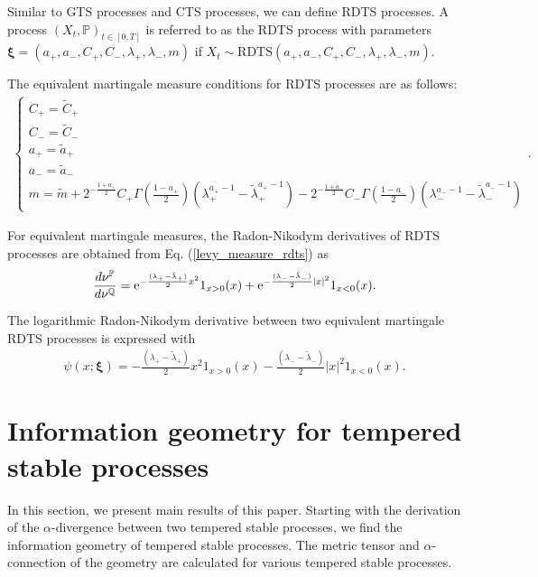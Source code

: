 \documentclass[preprint,11pt]{amsart}
\begin{document}
	Similar to GTS processes and CTS processes, we can define RDTS processes. A process $(X_t, \mathbb{P})_{t\in[0,T]}$ is referred to as the RDTS process with parameters $\boldsymbol{\xi}=(a_+, a_-, C_+, C_-, \lambda_+, \lambda_-, m)$ if $X_t\sim\mathrm{RDTS}(a_+, a_-, C_+, C_-,\lambda_+,\lambda_-,m)$.
	
	The equivalent martingale measure conditions for RDTS processes \cite{rachev2011financial} are as follows:
	\begin{align}
	\label{emm_rdts}
	\left\{ 
		\begin{array}{ll}
			C_+=\tilde{C}_+\\
			C_-=\tilde{C}_-\\
			a_+=\tilde{a}_+\\
			a_-=\tilde{a}_-\\
			m=\tilde{m}+2^{-\frac{1+a_+}{2}}C_+\Gamma(\frac{1-a_+}{2})(\lambda_+^{a_+-1}-\tilde{\lambda}_{+}^{a_+-1})-2^{-\frac{1+a_-}{2}}C_-\Gamma(\frac{1-a_-}{2})(\lambda_-^{a_--1}-\tilde{\lambda}_{-}^{a_--1})
		\end{array}
		\right..
	\end{align}
	
	For equivalent martingale measures, the Radon-Nikodym derivatives of RDTS processes are obtained from Eq. (\ref{levy_measure_rdts}) as
	\begin{align}
	\label{radon_nikodym_rdts}
		\frac{d\nu^\mathbb{P}}{d\nu^\mathbb{Q}}={\rm e}^{-\frac{(\lambda_+-\tilde{\lambda}_+)}{2}x^2} 1_{x>0}(x)+{\rm e}^{-\frac{(\lambda_{-}-\tilde{\lambda}_{-})}{2}|x|^2} 1_{x<0}(x).
	\end{align}
	
	The logarithmic Radon-Nikodym derivative between two equivalent martingale RDTS processes is expressed with
	\begin{align}
	\label{log_radon_nikodym_rdts}
		\psi(x;\boldsymbol{\xi})=-\frac{(\lambda_+-\tilde{\lambda}_+)}{2}x^2 1_{x>0}(x)-\frac{(\lambda_{-}-\tilde{\lambda}_{-})}{2}|x|^2 1_{x<0}(x).
	\end{align}
	
\section{Information geometry for tempered stable processes}
\label{sec_ig}
	In this section, we present main results of this paper. Starting with the derivation of the $\alpha$-divergence between two tempered stable processes, we find the information geometry of tempered stable processes. The metric tensor and $\alpha$-connection of the geometry are calculated for various tempered stable processes.
	 
\end{document}
